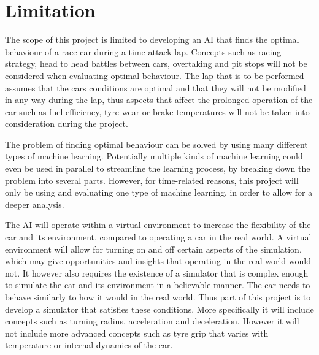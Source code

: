 




\section{Limitation}


The scope of this project is limited to developing an AI that finds the optimal behaviour of a race car during a time attack lap. Concepts such as racing strategy, head to head battles between cars, overtaking and pit stops will not be considered when evaluating optimal behaviour. The lap that is to be performed assumes that the cars conditions are optimal and that they will not be modified in any way during the lap, thus aspects that affect the prolonged operation of the car such as fuel efficiency, tyre wear or brake temperatures will not be taken into consideration during the project.

The problem of finding optimal behaviour can be solved by using many different types of machine learning. Potentially multiple kinds of machine learning could even be used in parallel to streamline the learning process, by breaking down the problem into several parts. However, for time-related reasons, this project will only be using and evaluating one type of machine learning, in order to allow for a deeper analysis.

The AI will operate within a virtual environment to increase the flexibility of the car and its environment, compared to operating a car in the real world. A virtual environment will allow for turning on and off certain aspects of the simulation, which may give opportunities and insights that operating in the real world would not. It however also requires the existence of a simulator that is complex enough to simulate the car and its environment in a believable manner. The car needs to behave similarly to how it would in the real world. Thus part of this project is to develop a simulator that satisfies these conditions. More specifically it will include concepts such as turning radius, acceleration and deceleration. However it will not include more advanced concepts such as tyre grip that varies with temperature or internal dynamics of the car.

